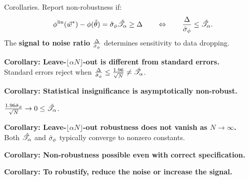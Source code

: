 
\begin{frame}[t]{Corollaries.}
%
Report non-robustness if:
%
\begin{align*}
%
\thetafunlin(\w^*) - \thetafun(\thetahat)  = \noise \shape \ge \Delta
\quad\quad
\Leftrightarrow
\quad\quad
\frac{\Delta}{\noise} \le \shape.
%
\end{align*}
%
The \textbf{signal to noise ratio} $\frac{\Delta}{\hat\sigma_{\phi}}$
determines sensitivity to data dropping.


\hrulefill


\pause
\vspace{0.5em}
\textbf{Corollary:  Leave-$\lfloor \alpha N \rfloor$-out is different from standard errors.}\\
Standard errors reject when
$\frac{\Delta}{\hat\sigma_{\phi}} \le \frac{1.96}{\sqrt{N}} \ne \hat{\mathscr{T}}_\alpha$.

\pause
\vspace{0.5em}
\textbf{Corollary:  Statistical insignificance is asymptotically non-robust.}

$\frac{1.96 \hat \sigma_\phi}{\sqrt{N}} \rightarrow 0 \le \hat{\mathscr{T}}_\alpha$.

\pause
\vspace{0.5em}
\textbf{Corollary:  Leave-$\lfloor \alpha N \rfloor$-out robustness does not vanish as $N \rightarrow \infty$.}\\
%
Both $\hat{\mathscr{T}}_\alpha$ and $\hat\sigma_{\phi}$ typically converge to nonzero constants.

\pause
\vspace{0.5em}
\textbf{Corollary:  Non-robustness possible even with correct specification.}
%

\pause
\vspace{0.5em}
\textbf{Corollary:  To robustify, reduce the noise or increase
the signal.}

\end{frame}
